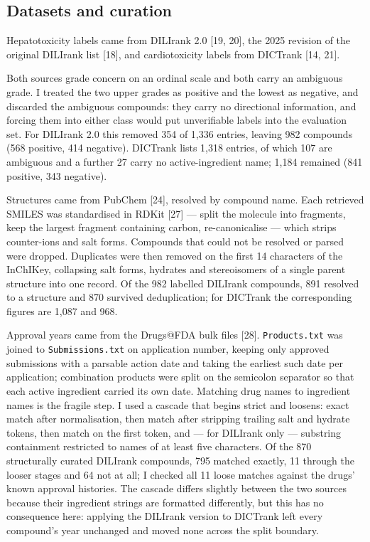\documentclass[pdflatex,sn-basic,Numbered,referee,lineno]{sn-jnl}%
\theoremstyle{thmstyleone}%
\theoremstyle{thmstyletwo}%
\theoremstyle{thmstylethree}%
\begin{document}
\subsection{Datasets and curation}

Hepatotoxicity labels came from DILIrank 2.0 [19, 20], the 2025 revision of the original DILIrank list [18], and cardiotoxicity labels from DICTrank [14, 21].

Both sources grade concern on an ordinal scale and both carry an ambiguous grade. I treated the two upper grades as positive and the lowest as negative, and discarded the ambiguous compounds: they carry no directional information, and forcing them into either class would put unverifiable labels into the evaluation set. For DILIrank 2.0 this removed 354 of 1,336 entries, leaving 982 compounds (568 positive, 414 negative). DICTrank lists 1,318 entries, of which 107 are ambiguous and a further 27 carry no active-ingredient name; 1,184 remained (841 positive, 343 negative).

Structures came from PubChem [24], resolved by compound name. Each retrieved SMILES was standardised in RDKit [27] --- split the molecule into fragments, keep the largest fragment containing carbon, re-canonicalise --- which strips counter-ions and salt forms. Compounds that could not be resolved or parsed were dropped. Duplicates were then removed on the first 14 characters of the InChIKey, collapsing salt forms, hydrates and stereoisomers of a single parent structure into one record. Of the 982 labelled DILIrank compounds, 891 resolved to a structure and 870 survived deduplication; for DICTrank the corresponding figures are 1,087 and 968.

Approval years came from the Drugs@FDA bulk files [28]. \texttt{Products.txt} was joined to \texttt{Submissions.txt} on application number, keeping only approved submissions with a parsable action date and taking the earliest such date per application; combination products were split on the semicolon separator so that each active ingredient carried its own date. Matching drug names to ingredient names is the fragile step. I used a cascade that begins strict and loosens: exact match after normalisation, then match after stripping trailing salt and hydrate tokens, then match on the first token, and --- for DILIrank only --- substring containment restricted to names of at least five characters. Of the 870 structurally curated DILIrank compounds, 795 matched exactly, 11 through the looser stages and 64 not at all; I checked all 11 loose matches against the drugs' known approval histories. The cascade differs slightly between the two sources because their ingredient strings are formatted differently, but this has no consequence here: applying the DILIrank version to DICTrank left every compound's year unchanged and moved none across the split boundary.
\end{document}
